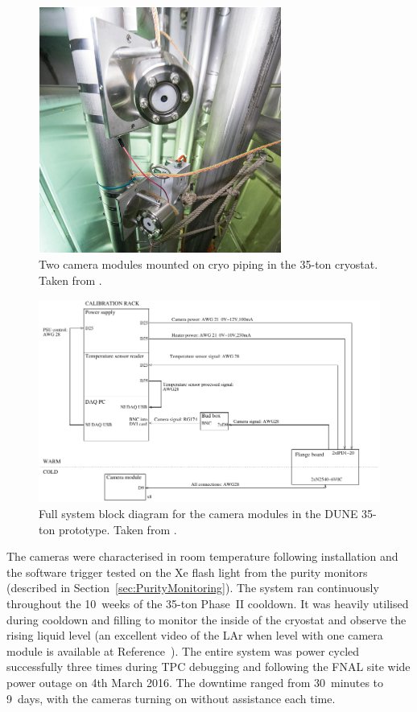 \begin{figure}
  \centering
  \includegraphics[width=8cm]{35tonCameraMounted.pdf}
  \caption[Two camera modules mounted on cryo piping in the 35-ton cryostat.]{Two camera modules mounted on cryo piping in the 35-ton cryostat.  Taken from \cite{35tonCameras2017}.}
  \label{fig:35tonCameraMounted}
\end{figure}

\begin{figure}
  \centering
  \includegraphics[width=12cm]{35tonCameraDiagram.pdf}
  \caption[Full system block diagram for the camera modules in the DUNE 35-ton prototype.]{Full system block diagram for the camera modules in the DUNE 35-ton prototype.  Taken from \cite{35tonCameras2017}.}
  \label{fig:35tonCameraDiagram}
\end{figure}

The cameras were characterised in room temperature following installation and the software trigger tested on the Xe flash light from the purity monitors (described in Section~\ref{sec:PurityMonitoring}).  The system ran continuously throughout the 10~weeks of the 35-ton Phase~II cooldown.  It was heavily utilised during cooldown and filling to monitor the inside of the cryostat and observe the rising liquid level (an excellent video of the LAr when level with one camera module is available at Reference~\cite{35tonCameraVideo}).  The entire system was power cycled successfully three times during TPC debugging and following the FNAL site wide power outage on 4th March 2016.  The downtime ranged from 30~minutes to 9~days, with the cameras turning on without assistance each time.

